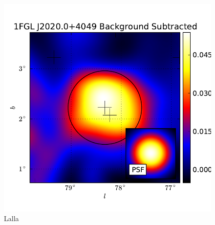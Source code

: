 \documentclass{emulateapj}
\begin{document}
  \begin{figure}
    \begin{center}
      \includegraphics[type=pdf,ext=.pdf,read=.pdf]{source_plots/source_1FGL_J2020.0+4049}
    \end{center}
    \caption{Lalla}
  \end{figure}
\end{document}

